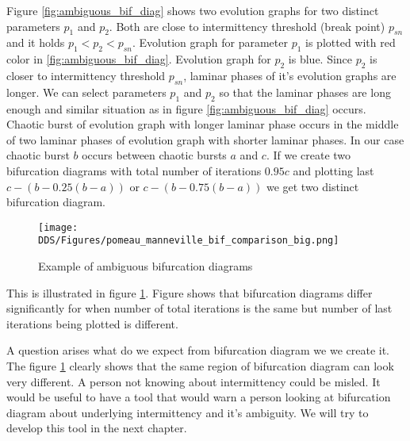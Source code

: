 Figure \ref{fig:ambiguous_bif_diag} shows two evolution graphs for two distinct parameters $p_1$ and $p_2$.
Both are close to intermittency threshold (break point) $p_{sn}$ and it holds $p_1 < p_2 < p_{sn}$.
Evolution graph for parameter $p_1$ is plotted with red color in \ref{fig:ambiguous_bif_diag}.
Evolution graph for $p_2$ is blue.
Since $p_2$ is closer to intermittency threshold $p_{sn}$, laminar phases of it's evolution graphs are longer.
We can select parameters $p_1$ and $p_2$ so that the laminar phases are long enough and similar situation as in figure \ref{fig:ambiguous_bif_diag} occurs.
Chaotic burst of evolution graph with longer laminar phase occurs in the middle of two laminar phases of evolution graph with shorter laminar phases.
In our case chaotic burst $b$ occurs between chaotic bursts $a$ and $c$.
If we create two bifurcation diagrams with total number of iterations $0.95 c$ and plotting last $c-(b-0.25(b-a))$ or $c-(b-0.75(b-a))$ we get two distinct bifurcation diagram.


\begin{figure}[!h]
    \centering
    \texttt{[image: DDS/Figures/pomeau\_manneville\_bif\_comparison\_big.png]}
    \caption{Example of ambiguous bifurcation diagrams}
    \label{fig:ambiguous_bif_diag_example}
\end{figure}

This is illustrated in figure \ref{fig:ambiguous_bif_diag_example}.
Figure shows that bifurcation diagrams differ significantly for when number of total iterations is the same but number of last iterations being plotted is different.
\par
A question arises what do we expect from bifurcation diagram we we create it.
The figure \ref{fig:ambiguous_bif_diag_example} clearly shows that the same region of bifurcation diagram can look very different.
A person not knowing about intermittency could be misled.
It would be useful to have a tool that would warn a person looking at bifurcation diagram about underlying intermittency and it's ambiguity.
We will try to develop this tool in the next chapter.

\endinput